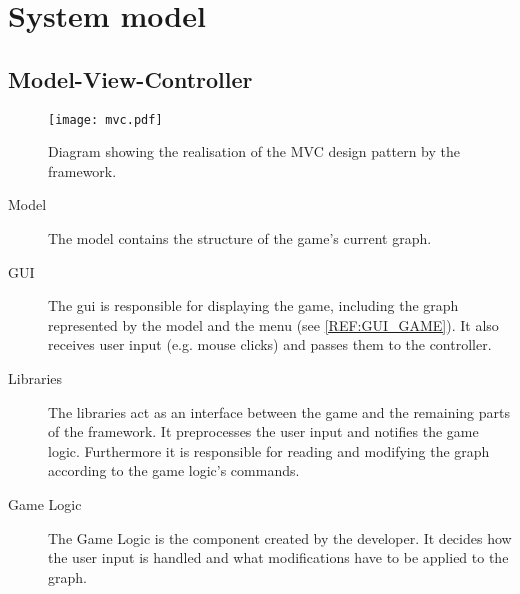\section{System model}

\subsection{Model-View-Controller}


\begin{figure}[h]
	\centering
	\texttt{[image: mvc.pdf]}
	\caption{Diagram showing the realisation of the \gls{MVC} design pattern by the framework.}
	\label{img:MVC}
\end{figure}

\begin{description}
\item[Model] The model contains the structure of the \gls{game}'s current \gls{graph}.
\item[GUI] The \gls{gui} is responsible for displaying the game, including the \gls{graph} represented by the model and the menu (see \ref{REF:GUI_GAME}). It also receives user input (e.g. mouse clicks) and passes them to the controller.
\item[Libraries] The libraries act as an interface between the game and the remaining parts of the framework. It preprocesses the user input and notifies the game logic. Furthermore it is responsible for reading and modifying the \gls{graph} according to the game logic's commands.
\item[Game Logic] The Game Logic is the component created by the \gls{developer}. It decides how the user input is handled and what modifications have to be applied to the \gls{graph}.
\end{description}

